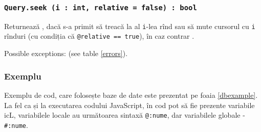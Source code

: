 \subsubsection{\texttt{Query.seek (i : int, relative = false) : bool}}

Returnează \true, dacă s-a primit să treacă la al \texttt{i}-lea rînd sau să mute cursorul cu \texttt{i} rînduri (cu condiția că \texttt{@relative == true}), în caz contrar \false.

Possible exceptions:  (see table \ref{errors}).

\subsubsection{Exemplu}

Exemplu de cod, care folosește baze de date este prezentat pe foaia \ref{dbexample}. La fel ca și la executarea codului JavaScript, în cod pot să fie prezente variabile icL, variabilele locale au următoarea sintaxă \texttt{@:nume}, dar variabilele globale - \texttt{#:nume}.

\newpage
\begin{sourcecode}
    \label{dbexample}
    \inputminted[linenos]{icl}{../sources/dbexample.icL}
\end{sourcecode}


